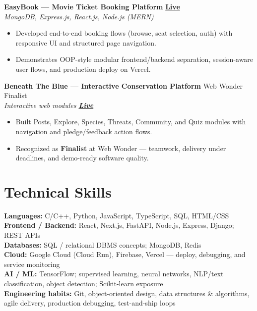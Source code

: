 \documentclass[a4paper,10pt]{article}
\begin{document}
\vspace{0.8mm}
\noindent\textbf{EasyBook --- Movie Ticket Booking Platform}
\hfill \href{https://easy-book-kappa.vercel.app/}{\textbf{\small Live}}\\
\textit{\small MongoDB, Express.js, React.js, Node.js (MERN)}\\[0.4mm]
\begin{itemize}
  \item Developed end-to-end booking flows (browse, seat selection, auth) with responsive UI and structured page navigation.
  \item Demonstrates OOP-style modular frontend/backend separation, session-aware user flows, and production deploy on Vercel.
\end{itemize}

\vspace{0.8mm}
\noindent\textbf{Beneath The Blue --- Interactive Conservation Platform}
\hfill {\small Web Wonder Finalist}\\
\textit{\small Interactive web modules \textbar{} \href{https://beneath-the-blue-1-3c6o.onrender.com/}{\textbf{Live}}}\\[0.4mm]
\begin{itemize}
  \item Built Posts, Explore, Species, Threats, Community, and Quiz modules with navigation and pledge/feedback action flows.
  \item Recognized as \textbf{Finalist} at Web Wonder --- teamwork, delivery under deadlines, and demo-ready software quality.
\end{itemize}

\section{Technical Skills}
\noindent\small
\textbf{Languages:} C/C++, Python, JavaScript, TypeScript, SQL, HTML/CSS \\[0.35mm]
\textbf{Frontend / Backend:} React, Next.js, FastAPI, Node.js, Express, Django; REST APIs \\[0.35mm]
\textbf{Databases:} SQL / relational DBMS concepts; MongoDB, Redis \\[0.35mm]
\textbf{Cloud:} Google Cloud (Cloud Run), Firebase, Vercel --- deploy, debugging, and service monitoring \\[0.35mm]
\textbf{AI / ML:} TensorFlow; supervised learning, neural networks, NLP/text classification, object detection; Scikit-learn exposure \\[0.35mm]
\textbf{Engineering habits:} Git, object-oriented design, data structures \& algorithms, agile delivery, production debugging, test-and-ship loops
\end{document}
